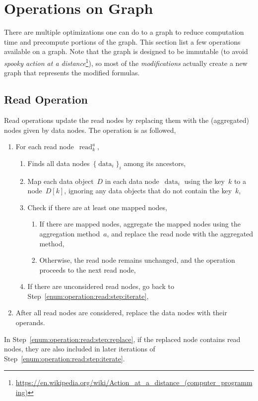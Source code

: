 \documentclass{article}
\DeclareMathOperator{\readNode}{read}
\DeclareMathOperator{\dataNode}{data}
\begin{document}
\section{Operations on Graph}

There are multiple optimizations one can do to a graph to reduce computation time and precompute portions of the graph.
This section list a few operations available on a graph.
Note that the graph is designed to be immutable (to avoid \emph{spooky action at a distance}\footnote{
	\url{https://en.wikipedia.org/wiki/Action_at_a_distance_(computer_programming)}
}), so most of the \emph{modifications} actually create a new graph that represents the modified formulas.

\subsection{Read Operation}
\label{sec:operation:read}

Read operations update the read nodes by replacing them with the (aggregated) nodes given by data nodes.
The operation is as followed,
\begin{enumerate}
	\item\label{enum:operation:read:step:iterate} For each read node~$\readNode_k^a$,
	\begin{enumerate}
		\item Finds all data nodes~$\{\dataNode_i\}_i$ among its ancestors,
		\item Map each data object~$D$ in each data node~$\dataNode_i$ using the key~$k$ to a node~$D[k]$, ignoring any data objects that do not contain the key~$k$,
		\item Check if there are at least one mapped nodes,
		      \begin{enumerate}
			      \item\label{enum:operation:read:step:replace} If there are mapped nodes, aggregate the mapped nodes using the aggregation method~$a$, and replace the read node with the aggregated method,
			      \item Otherwise, the read node remains unchanged, and the operation proceeds to the next read node,
		      \end{enumerate}
		\item If there are unconsidered read nodes, go back to Step~\ref{enum:operation:read:step:iterate},
	\end{enumerate}
	\item After all read nodes are considered, replace the data nodes with their operands.
\end{enumerate}
%
In Step~\ref{enum:operation:read:step:replace}, if the replaced node contains read nodes, they are also included in later iterations of Step~\ref{enum:operation:read:step:iterate}.
\end{document}
